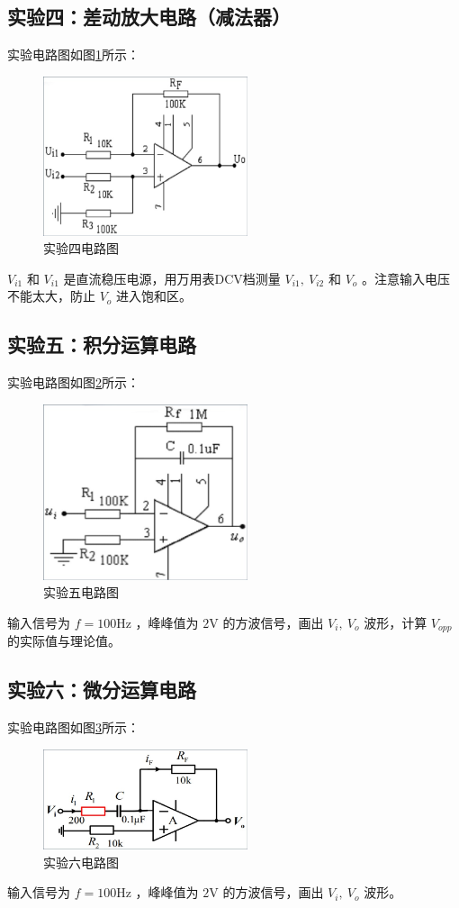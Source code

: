 \documentclass[a4paper,11pt,UTF8]{ctexart}
\newcommand\mr[1]{\mathrm{#1}}
\begin{document}
 \subsection{实验四：差动放大电路（减法器）}
 实验电路图如图\ref{fig:Exp04}所示：
 \begin{figure}[H]
  \centering
  \includegraphics[width=6cm]{Exp04Circ}
  \caption{实验四电路图}
  \label{fig:Exp04}
 \end{figure}
 $V_{i1}$ 和 $V_{i1}$ 是直流稳压电源，用万用表DCV档测量 $V_{i1},~V_{i2}$ 和 $V_o$ 。注意输入电压不能太大，防止 $V_o$ 进入饱和区。
 \subsection{实验五：积分运算电路}
 实验电路图如图\ref{fig:Exp05}所示：
 \begin{figure}[H]
  \centering
  \includegraphics[width=6cm]{Exp05Circ}
  \caption{实验五电路图}
  \label{fig:Exp05}
 \end{figure}
 输入信号为 $f=100\mr{Hz}$ ，峰峰值为 $2\mr{V}$ 的方波信号，画出 $V_i,~V_o$ 波形，计算 $V_{opp}$ 的实际值与理论值。
 \subsection{实验六：微分运算电路}
 实验电路图如图\ref{fig:Exp06}所示：
 \begin{figure}[H]
  \centering
  \includegraphics[width=6cm]{Exp06Circ}
  \caption{实验六电路图}
  \label{fig:Exp06}
 \end{figure}
 输入信号为 $f=100\mr{Hz}$ ，峰峰值为 $2\mr{V}$ 的方波信号，画出 $V_i,~V_o$ 波形。
 
\end{document}
